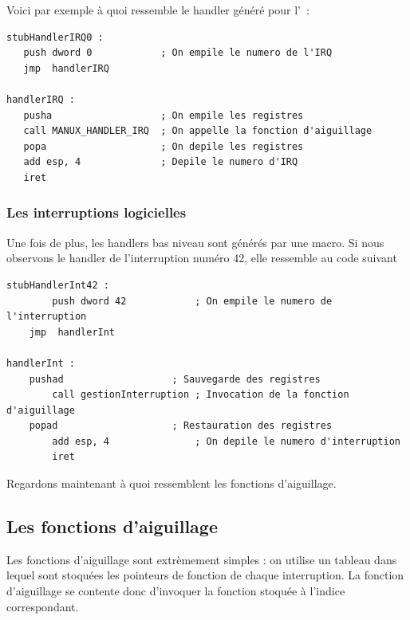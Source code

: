    Voici par exemple à quoi ressemble le handler généré pour l'~:
   
\begin{lstlisting}
stubHandlerIRQ0 :
   push dword 0            ; On empile le numero de l'IRQ
   jmp  handlerIRQ

handlerIRQ :
   pusha                   ; On empile les registres
   call MANUX_HANDLER_IRQ  ; On appelle la fonction d'aiguillage
   popa                    ; On depile les registres
   add esp, 4              ; Depile le numero d'IRQ
   iret
\end{lstlisting}

%
\subsubsection{Les interruptions logicielles}

   Une fois de plus, les handlers bas niveau sont générés par une
macro. Si nous observons le handler de l'interruption numéro 42, elle
ressemble au code suivant

\begin{lstlisting}
stubHandlerInt42 :
        push dword 42            ; On empile le numero de l'interruption
	jmp  handlerInt
        
handlerInt :
	pushad                   ; Sauvegarde des registres
        call gestionInterruption ; Invocation de la fonction d'aiguillage
	popad                    ; Restauration des registres
        add esp, 4               ; On depile le numero d'interruption
        iret
\end{lstlisting}

   Regardons maintenant à quoi ressemblent les fonctions d'aiguillage.

%      
\subsection{Les fonctions d'aiguillage}

   Les fonctions d'aiguillage sont extrèmement simples : on utilise un
tableau dans lequel sont stoquées les pointeurs de fonction de chaque
interruption. La fonction d'aiguillage se contente donc d'invoquer la
fonction stoquée à l'indice correspondant.

